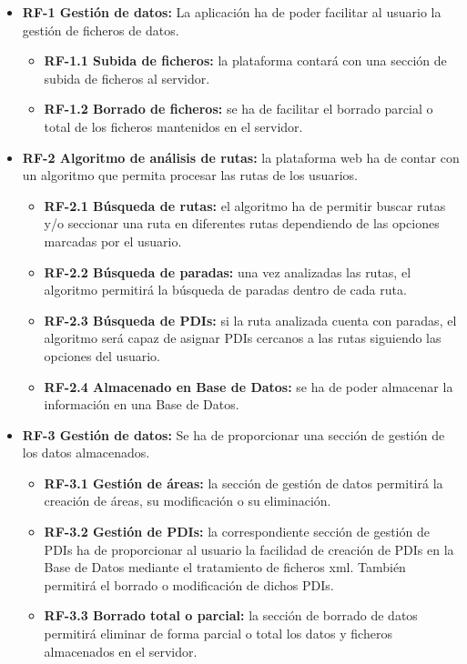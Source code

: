 \begin{itemize}
	\item \textbf{RF-1 Gestión de datos:} La aplicación ha de poder facilitar al usuario la gestión de ficheros de datos.
	\begin{itemize}
		\item \textbf{RF-1.1 Subida de ficheros:} la plataforma contará con una sección de subida de ficheros al servidor.
		\item \textbf{RF-1.2 Borrado de ficheros:} se ha de facilitar el borrado parcial o total de los ficheros mantenidos en el servidor.
	\end{itemize}
	
	\item \textbf{RF-2 Algoritmo de análisis de rutas:} la plataforma web ha de contar con un algoritmo que permita procesar las rutas de los usuarios.
	 \begin{itemize}
		\item \textbf{RF-2.1 Búsqueda de rutas:} el algoritmo ha de permitir buscar rutas y/o seccionar una ruta en diferentes rutas dependiendo de las opciones marcadas por el usuario.
		\item \textbf{RF-2.2 Búsqueda de paradas:} una vez analizadas las rutas, el algoritmo permitirá la búsqueda de paradas dentro de cada ruta.
		\item \textbf{RF-2.3 Búsqueda de PDIs:} si la ruta analizada cuenta con paradas, el algoritmo será capaz de asignar PDIs cercanos a las rutas siguiendo las opciones del usuario.
		\item \textbf{RF-2.4 Almacenado en Base de Datos:} se ha de poder almacenar la información en una Base de Datos.
	\end{itemize}
	
	\item \textbf{RF-3 Gestión de datos:} Se ha de proporcionar una sección de gestión de los datos almacenados.
	\begin{itemize}
		\item \textbf{RF-3.1 Gestión de áreas:} la sección de gestión de datos permitirá la creación de áreas, su modificación o su eliminación.
		\item \textbf{RF-3.2 Gestión de PDIs:} la correspondiente sección de gestión de PDIs ha de proporcionar al usuario la facilidad de creación de PDIs en la Base de Datos mediante el tratamiento de ficheros xml. También permitirá el borrado o modificación de dichos PDIs.
		\item \textbf{RF-3.3 Borrado total o parcial:} la sección de borrado de datos permitirá eliminar de forma parcial o total los datos y ficheros almacenados en el servidor.
	\end{itemize}
	

\end{itemize}
